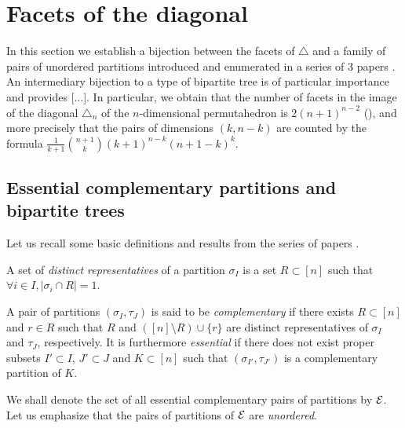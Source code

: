 
\section{Facets of the diagonal} 
\label{s:facets}

In this section we establish a bijection between the facets of $\triangle$ and a family of pairs of unordered partitions introduced and enumerated in a series of 3 papers \cite{chen1969computer,chen1971tables,kajitani1982number}. An intermediary bijection to a type of bipartite tree is of particular importance and provides [...].
In particular, we obtain that the number of facets in the image of the diagonal $\triangle_n$ of the $n$-dimensional permutahedron is $2(n+1)^{n-2}$ (), and more precisely that the pairs of dimensions $(k,n-k)$ are counted by the formula $\frac{1}{k+1}\binom{n+1}{k}(k+1)^{n-k}(n+1-k)^{k}$. 


\subsection{Essential complementary partitions and bipartite trees}
Let us recall some basic definitions and results from the series of papers \cite{chen1969computer,chen1971tables,kajitani1982number}.

\begin{definition}
A set of \emph{distinct representatives} of a partition $\sigma_I$ is a set $R\subset [n]$ such that $\forall i \in I,|\sigma_i \cap R| = 1$.
\end{definition}

\begin{definition}
A pair of partitions $(\sigma_I,\tau_J)$ is said to be \emph{complementary} if there exists $R\subset [n]$ and $r \in R$ such that $R$ and $([n]\setminus R) \cup \{r\}$ are distinct representatives of $\sigma_I$ and $\tau_J$, respectively.
It is furthermore \emph{essential} if there does not exist proper subsets $ I'\subset I$, $J'\subset J$ and $K \subset [n]$ such that $(\sigma_{I'},\tau_{J'})$ is a complementary partition of $K$.
\end{definition}

We shall denote the set of all essential complementary pairs of partitions by $\mathcal{E}$.
Let us emphasize that the pairs of partitions of $\mathcal{E}$ are \emph{unordered}.


